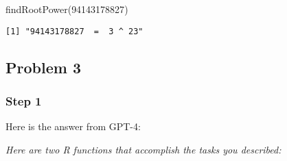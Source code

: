 \documentclass[
  letterpaper,
  DIV=11,
  numbers=noendperiod]{scrartcl}
\newenvironment{Shaded}{\begin{snugshade}}{\end{snugshade}}
\newcommand{\DecValTok}[1]{\textcolor[rgb]{0.68,0.00,0.00}{#1}}
\newcommand{\FunctionTok}[1]{\textcolor[rgb]{0.28,0.35,0.67}{#1}}
\newcommand{\NormalTok}[1]{\textcolor[rgb]{0.00,0.23,0.31}{#1}}
\begin{document}
\begin{Shaded}
\begin{Highlighting}[]
\FunctionTok{findRootPower}\NormalTok{(}\DecValTok{94143178827}\NormalTok{)}
\end{Highlighting}
\end{Shaded}

\begin{verbatim}
[1] "94143178827  =  3 ^ 23"
\end{verbatim}

\hypertarget{problem-3}{%
\subsection{Problem 3}\label{problem-3}}

\hypertarget{step-1-2}{%
\subsubsection{Step 1}\label{step-1-2}}

Here is the answer from GPT-4:

\emph{Here are two R functions that accomplish the tasks you described:}
\end{document}
